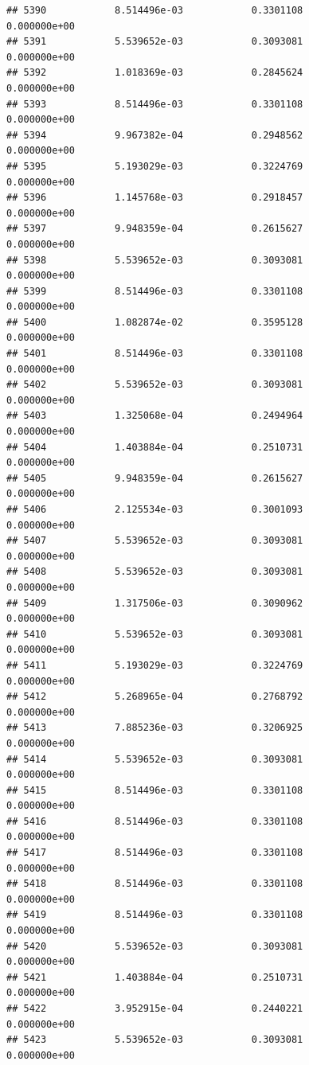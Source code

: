 \documentclass[
]{article}
\begin{document}
\begin{verbatim}
## 5390            8.514496e-03            0.3301108            0.000000e+00
## 5391            5.539652e-03            0.3093081            0.000000e+00
## 5392            1.018369e-03            0.2845624            0.000000e+00
## 5393            8.514496e-03            0.3301108            0.000000e+00
## 5394            9.967382e-04            0.2948562            0.000000e+00
## 5395            5.193029e-03            0.3224769            0.000000e+00
## 5396            1.145768e-03            0.2918457            0.000000e+00
## 5397            9.948359e-04            0.2615627            0.000000e+00
## 5398            5.539652e-03            0.3093081            0.000000e+00
## 5399            8.514496e-03            0.3301108            0.000000e+00
## 5400            1.082874e-02            0.3595128            0.000000e+00
## 5401            8.514496e-03            0.3301108            0.000000e+00
## 5402            5.539652e-03            0.3093081            0.000000e+00
## 5403            1.325068e-04            0.2494964            0.000000e+00
## 5404            1.403884e-04            0.2510731            0.000000e+00
## 5405            9.948359e-04            0.2615627            0.000000e+00
## 5406            2.125534e-03            0.3001093            0.000000e+00
## 5407            5.539652e-03            0.3093081            0.000000e+00
## 5408            5.539652e-03            0.3093081            0.000000e+00
## 5409            1.317506e-03            0.3090962            0.000000e+00
## 5410            5.539652e-03            0.3093081            0.000000e+00
## 5411            5.193029e-03            0.3224769            0.000000e+00
## 5412            5.268965e-04            0.2768792            0.000000e+00
## 5413            7.885236e-03            0.3206925            0.000000e+00
## 5414            5.539652e-03            0.3093081            0.000000e+00
## 5415            8.514496e-03            0.3301108            0.000000e+00
## 5416            8.514496e-03            0.3301108            0.000000e+00
## 5417            8.514496e-03            0.3301108            0.000000e+00
## 5418            8.514496e-03            0.3301108            0.000000e+00
## 5419            8.514496e-03            0.3301108            0.000000e+00
## 5420            5.539652e-03            0.3093081            0.000000e+00
## 5421            1.403884e-04            0.2510731            0.000000e+00
## 5422            3.952915e-04            0.2440221            0.000000e+00
## 5423            5.539652e-03            0.3093081            0.000000e+00

\end{verbatim}
\end{document}
